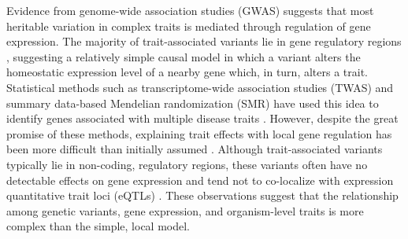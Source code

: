 \documentclass[
]{article}
\providecommand{\DIFaddtex}[1]{{\protect\color{blue}\uwave{#1}}} %
\providecommand{\DIFaddbegin}{} %
\providecommand{\DIFaddend}{} %
\providecommand{\DIFadd}[1]{\texorpdfstring{\DIFaddtex{#1}}{#1}} %
\newcommand{\DIFaddincludegraphics}[2][]{{\color{blue}\fbox{\DIFOincludegraphics[#1]{#2}}}} %
\DeclareRobustCommand{\DIFaddbegin}{\DIFOaddbegin \let\includegraphics\DIFaddincludegraphics} %
\DeclareRobustCommand{\DIFaddend}{\DIFOaddend \let\includegraphics\DIFOincludegraphics} %
\begin{document}
Evidence from genome-wide association studies (GWAS) suggests that most
heritable variation in complex traits is mediated through regulation of
gene expression. The majority of trait-associated variants lie in gene
regulatory regions
\cite{pmid22955828, pmid25363779, pmid21617055, pmid19474294, 
pmid24702953, pmid24316577, pmid27126046}, suggesting a relatively
simple causal model in which a variant alters the homeostatic expression
level of a nearby \DIFaddbegin \DIFadd{(local) }\DIFaddend gene which, in turn, alters a trait.
Statistical methods such as transcriptome-wide association studies
(TWAS) \cite{pmid33020666, pmid26258848, pmid27019110, pmid26854917} and
summary data-based Mendelian randomization (SMR) \cite{pmid27019110}
have used this idea to identify genes associated with multiple disease
traits \cite{pmid29567659, 
pmid35533209,  pmid27309819, pmid30950127}. However, despite the great
promise of these methods, explaining trait effects with local gene
regulation has been more difficult than initially assumed
\cite{pmid32912663, pmid36515579}. Although trait-associated variants
typically lie in non-coding, regulatory regions, these variants often
have no detectable effects on gene expression \cite{pmid32912663} and
tend not to co-localize with expression quantitative trait loci (eQTLs)
\cite{pmid36515579, pmid37857933}. These observations suggest that the
relationship among genetic variants, gene expression, and organism-level
traits is more complex than the simple, local model.
\end{document}
